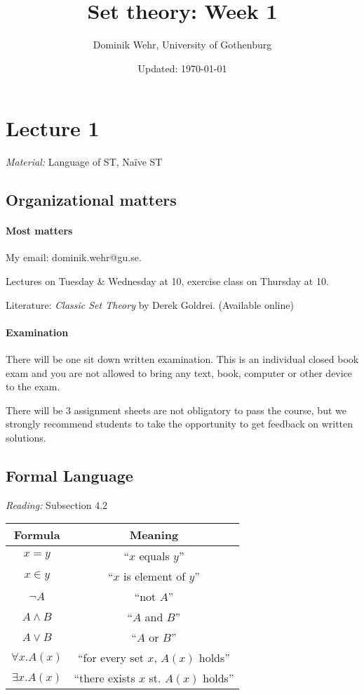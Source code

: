 \documentclass{whrartcl}
\title{Set theory: Week 1}
\author{Dominik Wehr, University of Gothenburg}
\date{Updated: \today}
\begin{document}
\maketitle

\section{Lecture 1}

\emph{Material:} Language of ST, Na\"ive ST

\subsection{Organizational matters}

\paragraph{Most matters}

My email: dominik.wehr@gu.se.

Lectures on Tuesday \& Wednesday at 10, exercise class on Thursday at 10.

Literature: \emph{Classic Set Theory} by Derek Goldrei. (Available online)

\paragraph{Examination}

There will be one sit down written examination. This is an individual closed
book exam and you are not allowed to bring any text, book, computer or other
device to the exam.

There will be 3 assignment sheets are not obligatory to pass the course, but we
strongly recommend students to take the opportunity to get feedback on written
solutions.

\subsection{Formal Language}
\emph{Reading:} Subsection 4.2

\begin{tabular}{c|c}
  Formula & Meaning \\
  \hline
  $x = y$ & ``$x$ equals $y$'' \\
  $x \in y$ & ``$x$ is element of $y$'' \\
  $\neg A$ & ``not $A$'' \\
  $A \wedge B$ & ``$A$ and $B$'' \\
  $A \vee B$ & ``$A$ or $B$'' \\
  $\forall x. A(x)$ & ``for every set $x$, $A(x)$ holds'' \\
  $\exists x. A(x)$ & ``there exists $x$ st. $A(x)$ holds''
\end{tabular}
\end{document}
